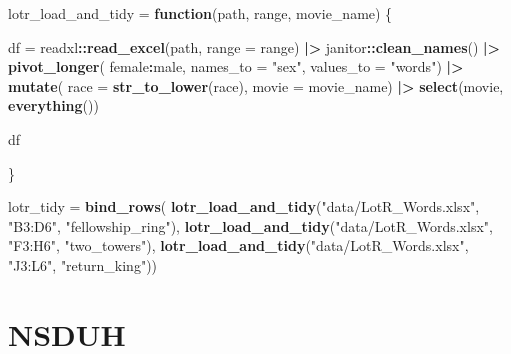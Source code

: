 \documentclass[
]{article}
\newenvironment{Shaded}{\begin{snugshade}}{\end{snugshade}}
\newcommand{\AttributeTok}[1]{\textcolor[rgb]{0.13,0.29,0.53}{#1}}
\newcommand{\ControlFlowTok}[1]{\textcolor[rgb]{0.13,0.29,0.53}{\textbf{#1}}}
\newcommand{\FunctionTok}[1]{\textcolor[rgb]{0.13,0.29,0.53}{\textbf{#1}}}
\newcommand{\NormalTok}[1]{#1}
\newcommand{\OtherTok}[1]{\textcolor[rgb]{0.56,0.35,0.01}{#1}}
\newcommand{\SpecialCharTok}[1]{\textcolor[rgb]{0.81,0.36,0.00}{\textbf{#1}}}
\newcommand{\StringTok}[1]{\textcolor[rgb]{0.31,0.60,0.02}{#1}}
\begin{document}
\begin{Shaded}
\begin{Highlighting}[]
\NormalTok{lotr\_load\_and\_tidy }\OtherTok{=} \ControlFlowTok{function}\NormalTok{(path, range, movie\_name) \{}
  
\NormalTok{  df }\OtherTok{=} 
\NormalTok{    readxl}\SpecialCharTok{::}\FunctionTok{read\_excel}\NormalTok{(path, }\AttributeTok{range =}\NormalTok{ range) }\SpecialCharTok{|\textgreater{}}
\NormalTok{    janitor}\SpecialCharTok{::}\FunctionTok{clean\_names}\NormalTok{() }\SpecialCharTok{|\textgreater{}}
    \FunctionTok{pivot\_longer}\NormalTok{(}
\NormalTok{      female}\SpecialCharTok{:}\NormalTok{male,}
      \AttributeTok{names\_to =} \StringTok{"sex"}\NormalTok{,}
      \AttributeTok{values\_to =} \StringTok{"words"}\NormalTok{) }\SpecialCharTok{|\textgreater{}}
    \FunctionTok{mutate}\NormalTok{(}
      \AttributeTok{race =} \FunctionTok{str\_to\_lower}\NormalTok{(race),}
      \AttributeTok{movie =}\NormalTok{ movie\_name) }\SpecialCharTok{|\textgreater{}} 
    \FunctionTok{select}\NormalTok{(movie, }\FunctionTok{everything}\NormalTok{())}
  
\NormalTok{  df}
  
\NormalTok{\}}

\NormalTok{lotr\_tidy }\OtherTok{=} 
  \FunctionTok{bind\_rows}\NormalTok{(}
    \FunctionTok{lotr\_load\_and\_tidy}\NormalTok{(}\StringTok{"data/LotR\_Words.xlsx"}\NormalTok{, }\StringTok{"B3:D6"}\NormalTok{, }\StringTok{"fellowship\_ring"}\NormalTok{),}
    \FunctionTok{lotr\_load\_and\_tidy}\NormalTok{(}\StringTok{"data/LotR\_Words.xlsx"}\NormalTok{, }\StringTok{"F3:H6"}\NormalTok{, }\StringTok{"two\_towers"}\NormalTok{),}
    \FunctionTok{lotr\_load\_and\_tidy}\NormalTok{(}\StringTok{"data/LotR\_Words.xlsx"}\NormalTok{, }\StringTok{"J3:L6"}\NormalTok{, }\StringTok{"return\_king"}\NormalTok{))}
\end{Highlighting}
\end{Shaded}

\section{NSDUH}\label{nsduh}
\end{document}
